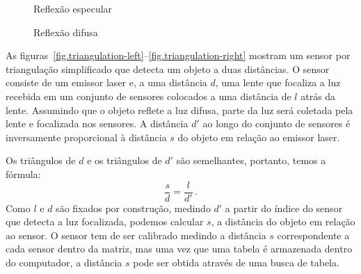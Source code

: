 \begin{figure}
\begin{minipage}{.45\textwidth}
\caption{Reflexão especular\label{fig.reflect-left}}
\end{minipage}
\hspace{\fill}
\begin{minipage}{.45\textwidth}
\caption{Reflexão difusa\label{fig.reflect-right}}
\end{minipage}
\end{figure}

As figuras~\ref{fig.triangulation-left}--\ref{fig.triangulation-right} mostram um sensor por triangulação simplificado que detecta um objeto a duas distâncias. O sensor consiste de um emissor laser e, a uma distância $d$, uma lente que focaliza a luz recebida em um conjunto de sensores colocados a uma distância de $l$ atrás da lente. Assumindo que o objeto reflete a luz difusa, parte da luz será coletada pela lente e focalizada nos sensores. A distância $d'$ ao longo do conjunto de sensores é inversamente proporcional à distância $s$ do objeto em relação ao emissor laser.

Os triângulos de $d$ e os triângulos de $d'$ são semelhantes, portanto, temos a fórmula:
\[
\frac{s}{d} = \frac{l}{d'}\,.
\]
Como $l$ e $d$ são fixados por construção, medindo $d'$ a partir do índice do sensor que detecta a luz focalizada, podemos calcular $s$, a distância do objeto em relação ao sensor. O sensor tem de ser calibrado medindo a distância $s$ correspondente a cada sensor dentro da matriz, mas uma vez que uma tabela é armazenada dentro do computador, a distância $s$ pode ser obtida através de uma busca de tabela.

